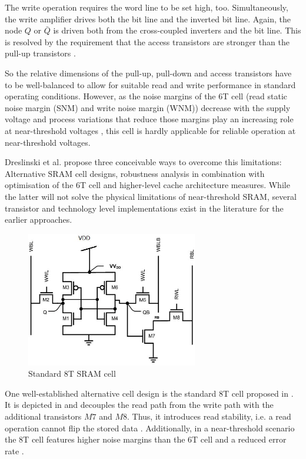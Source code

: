 \documentclass[conference]{IEEEtran}
\begin{document}
The write operation requires the word line to be set high, too. Simultaneously, the write amplifier drives both the bit line and the inverted bit line. Again, the node $Q$ or $\bar Q$ is driven both from the cross-coupled inverters and the bit line. This is resolved by the requirement that the access transistors are stronger than the pull-up transistors \cite{Senousy2016}.

So the relative dimensions of the pull-up, pull-down and access transistors have to be well-balanced to allow for suitable read and write performance in standard operating conditions. However, as the noise margins of the 6T cell (read static noise margin (SNM) and write noise margin (WNM)) decrease with the supply voltage \cite{Senousy2016} and process variations that reduce those margins play an increasing role at near-threshold voltages \cite{Dreslinski2010}, this cell is hardly applicable for reliable operation at near-threshold voltages. 

Dreslinski et al. \cite{Dreslinski2010} propose three conceivable ways to overcome this limitations: Alternative SRAM cell designs, robustness analysis in combination with optimisation of the 6T cell and higher-level cache architecture measures. While the latter will not solve the physical limitations of near-threshold SRAM, several transistor and technology level implementations exist in the literature for the earlier approaches.

\begin{figure}
	\centering
	\includegraphics[width=7.5cm]{8t_cell.png}
	\caption{Standard 8T SRAM cell \cite{8t}}
	\label{fig:8t}
\end{figure}

One well-established alternative cell design is the standard 8T cell proposed in \cite{Chang2008}. It is depicted in  and decouples the read path from the write path with the additional transistors $M7$ and $M8$. Thus, it introduces read stability, i.e. a read operation cannot flip the stored data \cite{Cho2020}. Additionally, in a near-threshold scenario the 8T cell features higher noise margins than the 6T cell and a reduced error rate \cite{Gebregiorgis2019}.
\end{document}

